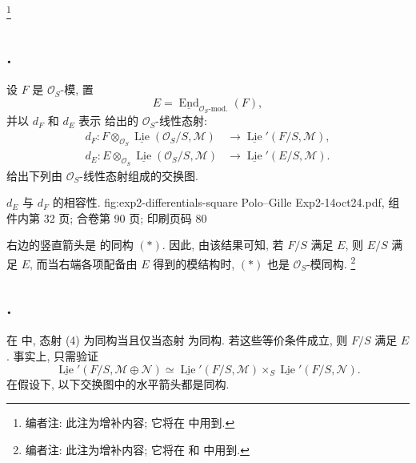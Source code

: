 \footnote{编者注: 此注为增补内容; 它将在  中用到.}

\subsection*{.}
设 \(F\) 是 \(\mathcal O_S\)-模, 置
\[
 E=\underline{\operatorname{End}}_{\mathcal O_S\text{-mod.}}(F),
\]
并以 \(d_F\) 和 \(d_E\) 表示
 给出的
\(\mathcal O_S\)-线性态射:
\[
\begin{aligned}
 d_F:
 F\otimes_{\mathcal O_S}
 \underline{\operatorname{Lie}}(\mathcal O_S/S,\mathcal M)
 &\longrightarrow
 \underline{\operatorname{Lie}}'(F/S,\mathcal M),\\
 d_E:
 E\otimes_{\mathcal O_S}
 \underline{\operatorname{Lie}}(\mathcal O_S/S,\mathcal M)
 &\longrightarrow
 \underline{\operatorname{Lie}}'(E/S,\mathcal M).
\end{aligned}
\]
 给出下列由
\(\mathcal O_S\)-线性态射组成的交换图.

  {\(d_E\) 与 \(d_F\) 的相容性.}
  {fig:exp2-differentials-square}
  {Polo--Gille Exp2-14oct24.pdf, 组件内第 32 页; 合卷第 90 页; 印刷页码 80}

右边的竖直箭头是  的同构 \((*)\).
因此, 由该结果可知, 若 \(F/S\) 满足 \(E\), 则 \(E/S\) 满足 \(E\),
而当右端各项配备由 \(E\) 得到的模结构时, \((*)\) 也是 \(\mathcal O_S\)-模同构.
\footnote{编者注: 此注为增补内容; 它将在 
和  中用到.}

\subsection*{.}
在  中,
态射 (4) 为同构当且仅当态射  为同构.
若这些等价条件成立, 则 \(F/S\) 满足 \(E\). 事实上, 只需验证
\[
 \underline{\operatorname{Lie}}'(F/S,\mathcal M\oplus\mathcal N)
 \simeq
 \underline{\operatorname{Lie}}'(F/S,\mathcal M)
 \times_S
 \underline{\operatorname{Lie}}'(F/S,\mathcal N).
\]
在假设下, 以下交换图中的水平箭头都是同构.


